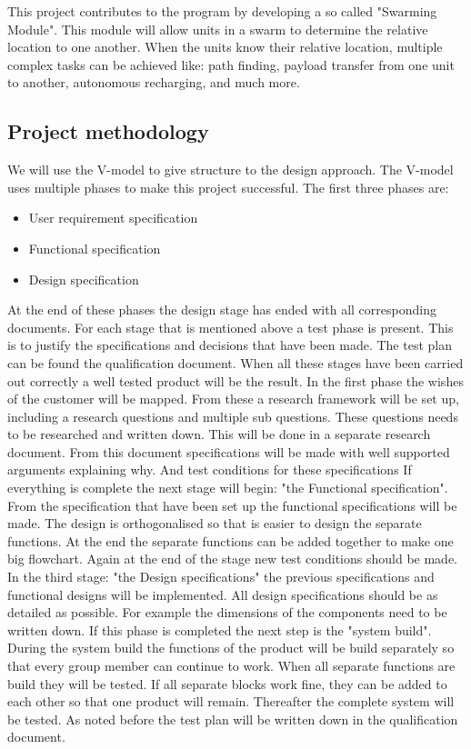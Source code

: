 \documentclass[10pt,a4paper]{article}
\begin{document}
This project contributes to the program by developing a so called "Swarming Module". This module will allow units in a swarm to determine the relative location to one another. When the units know their relative location, multiple complex tasks can be achieved like: path finding, payload transfer from one unit to another, autonomous recharging, and much more. 

\subsection{Project methodology}
We will use the V-model to give structure to the design approach. The V-model uses multiple phases to make this project successful. The first three phases are: 
\begin{itemize}
\item User requirement specification
\item Functional specification
\item Design specification
\end{itemize}
At the end of these phases the design stage has ended with all corresponding documents. For each stage that is mentioned above a test phase is present. This is to justify the specifications and decisions that have been made. The test plan can be found the qualification document. When all these stages have been carried out correctly a well tested product will be the result. In the first phase the wishes of the customer will be mapped. From these a research framework will be set up, including a research questions and multiple sub questions. These questions needs to be researched and written down. This will be done in a separate research document. From this document specifications will be made with well supported arguments explaining why. And test conditions for these specifications If everything is complete the next stage will begin: "the Functional specification". From the specification that have been set up the functional specifications will be made. The design is orthogonalised so that is easier to design the separate functions. At the end the separate functions can be added together to make one big flowchart. Again at the end of the stage new test conditions should be made. In the third stage: "the Design specifications" the previous specifications and functional designs will be implemented. All design specifications should be as detailed as possible. For example the dimensions of the components need to be written down. If this phase is completed the next step is the "system build". During the system build the  functions of the product will be build separately so that every group member can continue to work. When all separate functions are build they will be tested. If all separate blocks work fine, they can be added to each other so that one product will remain. Thereafter the complete system will be tested. As noted before the test plan will be written down in the qualification document. 
\end{document}
